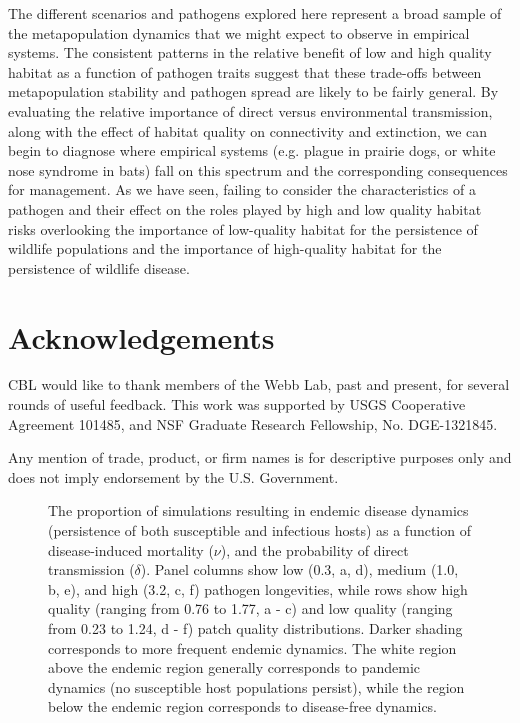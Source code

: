 \documentclass{article}
\begin{document}
The different scenarios and pathogens explored here represent a broad sample of the metapopulation dynamics that we might expect to observe in empirical systems.
The consistent patterns in the relative benefit of low and high quality habitat as a function of pathogen traits suggest that these trade-offs between metapopulation stability and pathogen spread are likely to be fairly general.  
By evaluating the relative importance of direct versus environmental transmission, along with the effect of habitat quality on connectivity and extinction, we can begin to diagnose where empirical systems (e.g. plague in prairie dogs, or white nose syndrome in bats) fall on this spectrum and the corresponding consequences for management.
As we have seen, failing to consider the characteristics of a pathogen and their effect on the roles played by high and low quality habitat risks overlooking the importance of low-quality habitat for the persistence of wildlife populations and the importance of high-quality habitat for the persistence of wildlife disease.

\section{Acknowledgements}

CBL would like to thank members of the Webb Lab, past and present, for several rounds of useful feedback.  This work was supported by USGS Cooperative Agreement 101485, and NSF Graduate Research Fellowship, No. DGE-1321845.

Any mention of trade, product, or firm names is for descriptive purposes only and does not imply endorsement by the U.S. Government.

\clearpage

     

\clearpage

\begin{figure}
\caption{The proportion of simulations resulting in endemic disease dynamics (persistence of both susceptible and infectious hosts) as a function of disease-induced mortality ($\nu$), and the probability of direct transmission ($\delta$).  Panel columns show low (0.3, a, d), medium (1.0, b, e), and high (3.2, c, f) pathogen longevities, while rows show high quality (ranging from 0.76 to 1.77, a - c) and low quality (ranging from 0.23 to 1.24, d - f) patch quality distributions.  Darker shading corresponds to more frequent endemic dynamics.  The white region above the endemic region generally corresponds to pandemic dynamics (no susceptible host populations persist), while the region below the endemic region corresponds to disease-free dynamics.}
\label{endemic}
\end{figure}
\end{document}
